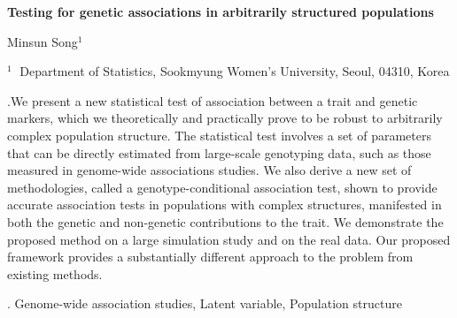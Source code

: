 \documentclass[12pt]{article}
\begin{document}
\begin{flushleft}


{\LARGE\bf Testing for genetic associations in arbitrarily structured populations}


\vspace{1.0cm}

Minsun Song$^1$

\begin{description}

\item $^1 \;$ Department of Statistics, Sookmyung Women's University,
Seoul, 04310, Korea 

\end{description}

\end{flushleft}


\vspace{0.75cm}

.We present a new statistical test of association between a trait and genetic markers, which we theoretically and practically prove to be robust to arbitrarily complex population structure. The statistical test involves a set of parameters that can be directly estimated from large-scale genotyping data, such as those measured in genome-wide associations studies. We also derive a new set of methodologies, called a genotype-conditional association test, shown to provide accurate association tests in populations with complex structures, manifested in both the genetic and non-genetic contributions to the trait. We demonstrate the proposed method on a large simulation study and on the real data. Our proposed framework provides a substantially different approach to the problem from existing methods.


\vskip 2mm

.
Genome-wide association studies,  Latent variable, Population structure
\end{document}
